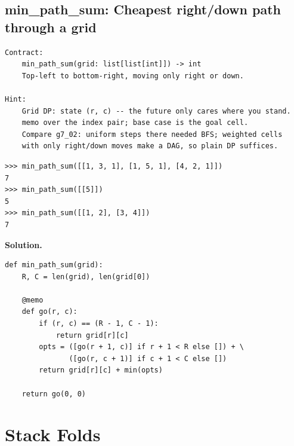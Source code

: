 \documentclass[10pt,letterpaper]{book}
\begin{document}
\section{min\_path\_sum: Cheapest right/down path through a grid}
\begin{lstlisting}[style=ex]
Contract:
    min_path_sum(grid: list[list[int]]) -> int
    Top-left to bottom-right, moving only right or down.

Hint:
    Grid DP: state (r, c) -- the future only cares where you stand.
    memo over the index pair; base case is the goal cell.
    Compare g7_02: uniform steps there needed BFS; weighted cells
    with only right/down moves make a DAG, so plain DP suffices.
\end{lstlisting}
\begin{lstlisting}[style=ex]
>>> min_path_sum([[1, 3, 1], [1, 5, 1], [4, 2, 1]])
7
>>> min_path_sum([[5]])
5
>>> min_path_sum([[1, 2], [3, 4]])
7
\end{lstlisting}
\noindent\textbf{Solution.}
\begin{lstlisting}[style=code]
def min_path_sum(grid):
    R, C = len(grid), len(grid[0])

    @memo
    def go(r, c):
        if (r, c) == (R - 1, C - 1):
            return grid[r][c]
        opts = ([go(r + 1, c)] if r + 1 < R else []) + \
               ([go(r, c + 1)] if c + 1 < C else [])
        return grid[r][c] + min(opts)

    return go(0, 0)
\end{lstlisting}
\chapter{Stack Folds}
\end{document}
